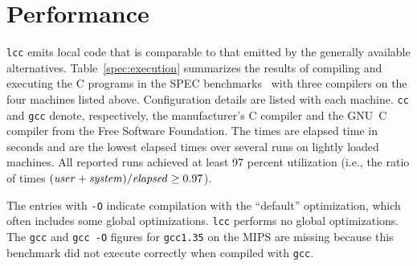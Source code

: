 \section{Performance}

\verb|lcc| emits local code that is comparable
to that emitted by the generally available alternatives.
Table~\ref{spec:execution} summarizes the results of compiling
and executing the C programs in the SPEC benchmarks~\cite{spec89}
with three compilers on the four machines listed above.
Configuration details are listed with each machine.
\verb|cc| and \verb|gcc| denote, respectively,
the manufacturer's C compiler and the
GNU~C compiler from the Free Software Foundation.
The times are elapsed time in seconds and are the lowest
elapsed times over several runs on lightly loaded machines.
All reported runs achieved at least 97 percent utilization (i.e., the ratio of times
$({\it user} + {\it system})/{\it elapsed} \ge 0.97$).

The entries with \verb|-O| indicate compilation with the
``default'' optimization, which often includes some global optimizations.
\verb|lcc| performs no global optimizations.
The \verb|gcc| and \verb|gcc -O| figures for {\tt gcc1.35} on the MIPS
are missing because this benchmark did not execute correctly
when compiled with \verb|gcc|. 

